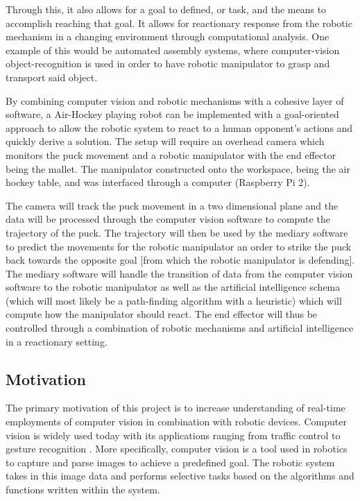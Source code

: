 \documentclass[letterpaper, 12 pt, conference]{ieeeconf}
\begin{document}
Through this, it also allows for a goal to defined, or task, and the means to accomplish reaching that goal.  It allows for reactionary response from the robotic mechanism in a changing environment through computational analysis.  One example of this would be automated assembly systems, where computer-vision object-recognition is used in order to have robotic manipulator to grasp and transport said object.

By combining computer vision and robotic mechanisms with a cohesive layer of software, a Air-Hockey playing robot can be implemented with a goal-oriented approach to allow the robotic system to react to a human opponent’s actions and quickly derive a solution. The setup will require an overhead camera which monitors the puck movement and a robotic manipulator with the end effector being the mallet. The manipulator constructed onto the workspace, being the air hockey table, and was interfaced through a computer (Raspberry Pi 2).

The camera will track the puck movement in a two dimensional plane and the data will be processed through the computer vision software to compute the trajectory of the puck.  The trajectory will then be used by the mediary software to predict the movements for the robotic manipulator an order to strike the puck back towards the opposite goal [from which the robotic manipulator is defending].  The mediary software will handle the transition of data from the computer vision software to the robotic manipulator as well as the artificial intelligence schema (which will most likely be a path-finding algorithm with a heuristic) which will compute how the manipulator should react. The end effector will thus be controlled through a combination of robotic mechanisms and artificial intelligence in a reactionary setting.

\subsection{Motivation}
\label{motivation}
The primary motivation of this project is to increase understanding of real-time employments of computer vision in combination with robotic devices. Computer vision is widely used today with its applications ranging from traffic control\cite{aliane} to gesture recognition \cite{bhame}.  More specifically, computer vision is a tool used in robotics to capture and parse images to achieve a predefined goal. The robotic system takes in this image data and performs selective tasks based on the algorithms and functions written within the system. 
\end{document}
